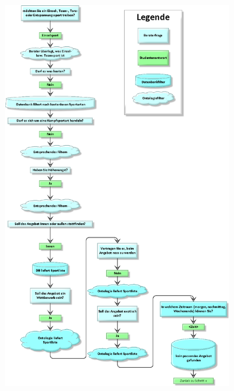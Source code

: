 \begin{capfigure}[Szenario 2]
	\includegraphics[width=100mm]{images/szenario2.png}
\end{capfigure}






